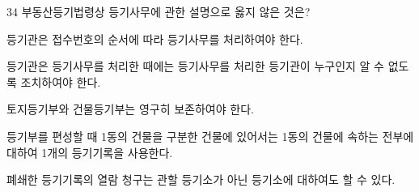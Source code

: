 \begin{question}{34}
부동산등기법령상 등기사무에 관한 설명으로 옳지 않은 것은?
\begin{choices}
  \item 등기관은 접수번호의 순서에 따라 등기사무를 처리하여야 한다.
  \item 등기관은 등기사무를 처리한 때에는 등기사무를 처리한 등기관이 누구인지 알 수 없도록 조치하여야 한다.
  \item 토지등기부와 건물등기부는 영구히 보존하여야 한다.
  \item 등기부를 편성할 때 1동의 건물을 구분한 건물에 있어서는 1동의 건물에 속하는 전부에 대하여 1개의 등기기록을 사용한다.
  \item 폐쇄한 등기기록의 열람 청구는 관할 등기소가 아닌 등기소에 대하여도 할 수 있다.
\end{choices}
\end{question}
